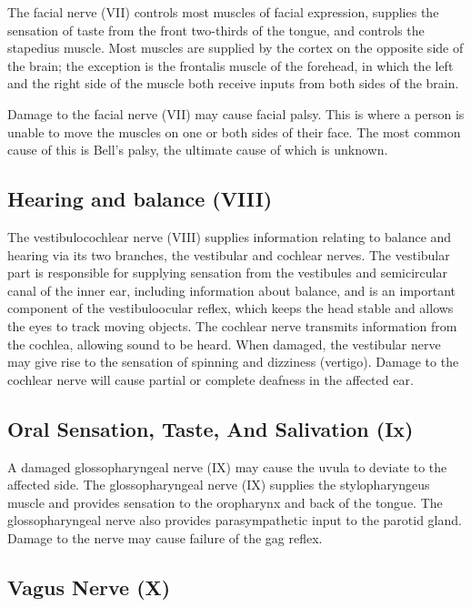 \documentclass[]{book}
\begin{document}
The facial nerve (VII) controls most muscles of facial expression, supplies the sensation of taste from the front two-thirds of the tongue, and controls the stapedius muscle. Most muscles are supplied by the cortex on the opposite side of the brain; the exception is the frontalis muscle of the forehead, in which the left and the right side of the muscle both receive inputs from both sides of the brain.

Damage to the facial nerve (VII) may cause facial palsy. This is where a person is unable to move the muscles on one or both sides of their face. The most common cause of this is Bell's palsy, the ultimate cause of which is unknown.

\hypertarget{hearing-and-balance-viii}{%
\subsection{Hearing and balance (VIII)}\label{hearing-and-balance-viii}}

The vestibulocochlear nerve (VIII) supplies information relating to balance and hearing via its two branches, the vestibular and cochlear nerves. The vestibular part is responsible for supplying sensation from the vestibules and semicircular canal of the inner ear, including information about balance, and is an important component of the vestibuloocular reflex, which keeps the head stable and allows the eyes to track moving objects. The cochlear nerve transmits information from the cochlea, allowing sound to be heard. When damaged, the vestibular nerve may give rise to the sensation of spinning and dizziness (vertigo). Damage to the cochlear nerve will cause partial or complete deafness in the affected ear.

\hypertarget{oral-sensation-taste-and-salivation-ix}{%
\subsection{Oral Sensation, Taste, And Salivation (Ix)}\label{oral-sensation-taste-and-salivation-ix}}

A damaged glossopharyngeal nerve (IX) may cause the uvula to deviate to the affected side.
The glossopharyngeal nerve (IX) supplies the stylopharyngeus muscle and provides sensation to the oropharynx and back of the tongue. The glossopharyngeal nerve also provides parasympathetic input to the parotid gland. Damage to the nerve may cause failure of the gag reflex.

\hypertarget{vagus-nerve-x}{%
\subsection{Vagus Nerve (X)}\label{vagus-nerve-x}}
\end{document}
